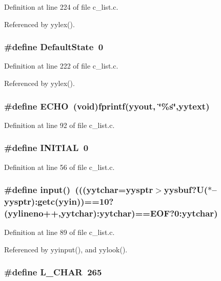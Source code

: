 Definition at line 224 of file c\_\-list.c.

Referenced by yylex().
\subsubsection{\setlength{\rightskip}{0pt plus 5cm}\#define Default\-State~0}\label{c__list_8c_9931e72b5f7e6382d2e7b0aaaf4a01fe}




Definition at line 222 of file c\_\-list.c.

Referenced by yylex().
\subsubsection{\setlength{\rightskip}{0pt plus 5cm}\#define ECHO~(void)fprintf(\bf{yyout}, \char`\"{}\%s\char`\"{},yytext)}\label{c__list_8c_ad1dc60a04a1d8cfc8b3ded13601e361}




Definition at line 92 of file c\_\-list.c.
\subsubsection{\setlength{\rightskip}{0pt plus 5cm}\#define INITIAL~0}\label{c__list_8c_a3d063564f6ab16f6d408b8369d0e9ff}




Definition at line 56 of file c\_\-list.c.
\subsubsection{\setlength{\rightskip}{0pt plus 5cm}\#define input()~(((\bf{yytchar}=\bf{yysptr}$>$\bf{yysbuf}?U($\ast$--\bf{yysptr}):getc(\bf{yyin}))==10?(\bf{yylineno}++,\bf{yytchar}):\bf{yytchar})==EOF?0:\bf{yytchar})}\label{c__list_8c_1dd66d9c1e77fe5c37ddce38fd30acb7}




Definition at line 89 of file c\_\-list.c.

Referenced by yyinput(), and yylook().
\subsubsection{\setlength{\rightskip}{0pt plus 5cm}\#define L\_\-CHAR~265}\label{c__list_8c_bf20d2179f811b0386ef9407f4797506}




